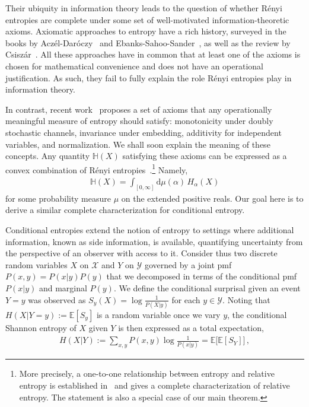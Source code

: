 \documentclass[aps,pra,11pt,onecolumn,nofootinbib,tightenlines]{revtex4-2}
\theoremstyle{definition}
\def \d {\mathrm{d}}
\renewcommand{\H}{\mathbb{H}}
\newcommand{\mc}[1]{\mathcal{#1}}
\newcommand{\mb}[1]{\mathbb{#1}}
\begin{document}
Their ubiquity in information theory leads to the question of whether Rényi entropies are complete under some set of well-motivated information-theoretic axioms. Axiomatic approaches to entropy have a rich history, surveyed in the books by Acz\'el-Dar\'oczy~\cite{aczel75} and Ebanks-Sahoo-Sander~\cite{ebanks98}, as well as the review by Csisz\'ar~\cite{csiszar08}. All these approaches have in common that at least one of the axioms is chosen for mathematical convenience and does not have an operational justification. As such, they fail to fully explain the role Rényi entropies play in information theory. 

In contrast, recent work~\cite{gour21_axiomatic} proposes a set of axioms that 
any operationally meaningful measure of entropy should satisfy: monotonicity under doubly stochastic channels, invariance under embedding, additivity for independent variables, and normalization. We shall soon explain the meaning of these concepts.
%
%
Any quantity $\H(X)$ satisfying these axioms can be expressed as a convex combination of Rényi entropies~\cite{mu21_renyi,gour21_axiomatic}.\footnote{More precisely, a one-to-one relationship between entropy and relative entropy is established in~\cite{gour21_axiomatic} and \cite{mu21_renyi} gives a complete characterization of relative entropy. The statement is also a special case of our main theorem.} Namely,
\begin{align}\label{eq:EntropyBarycentre}
    \H(X) = \int_{[0,\infty]} \d\mu(\alpha) \, H_{\alpha}(X)
\end{align}
for some probability measure $\mu$ on the extended positive reals. Our goal here is to derive a similar complete characterization for conditional entropy.

Conditional entropies extend the notion of entropy to settings where additional information, known as side information, is available, quantifying uncertainty from the perspective of an observer with access to it. 
Consider thus two discrete random variables $X$ on $\mc{X}$ and $Y$ on $\mc{Y}$ governed by a joint pmf $P(x,y) = P(x|y)P(y)$ that we decomposed in terms of the conditional pmf $P(x|y)$ and marginal $P(y)$. We define the conditional surprisal given an event $Y = y$ was observed as $S_{y}(X) = \log \frac{1}{P(X|y)}$ for each $y \in \mc{Y}$. Noting that $H(X|Y\!=\!y) := \mb{E}[S_y]$ is a random variable once we vary $y$, the conditional Shannon entropy of $X$ given $Y$ is then expressed as a total expectation, 
\begin{align}
    H(X|Y) := \sum_{x, y} P(x,y) \log \frac{1}{P(x|y)} = \mb{E}\big[\mb{E}[S_Y] \big] \,,
\end{align}
\end{document}
